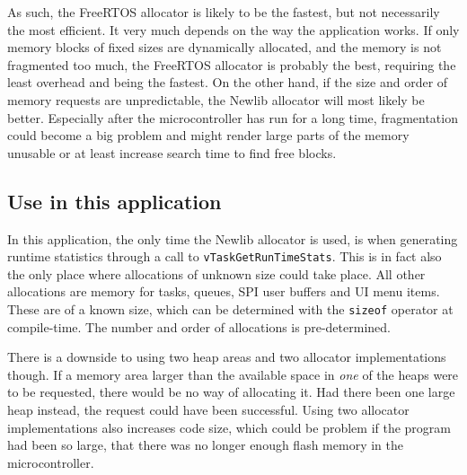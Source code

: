 As such, the FreeRTOS allocator is likely to be the fastest, but not necessarily the most efficient. It very much depends on the way the application works. If only memory blocks of fixed sizes are dynamically allocated, and the memory is not fragmented too much, the FreeRTOS allocator is probably the best, requiring the least overhead and being the fastest. On the other hand, if the size and order of memory requests are unpredictable, the Newlib allocator will most likely be better. Especially after the microcontroller has run for a long time, fragmentation could become a big problem and might render large parts of the memory unusable or at least increase search time to find free blocks.


\subsection{Use in this application}
In this application, the only time the Newlib allocator is used, is when generating runtime statistics through a call to \texttt{vTaskGetRunTimeStats}. This is in fact also the only place where allocations of unknown size could take place. All other allocations are memory for tasks, queues, SPI user buffers and UI menu items. These are of a known size, which can be determined with the \texttt{sizeof} operator at compile-time. The number and order of allocations is pre-determined.

There is a downside to using two heap areas and two allocator implementations though. If a memory area larger than the available space in \textit{one} of the heaps were to be requested, there would be no way of allocating it. Had there been one large heap instead, the request could have been successful. Using two allocator implementations also increases code size, which could be problem if the program had been so large, that there was no longer enough flash memory in the microcontroller.

